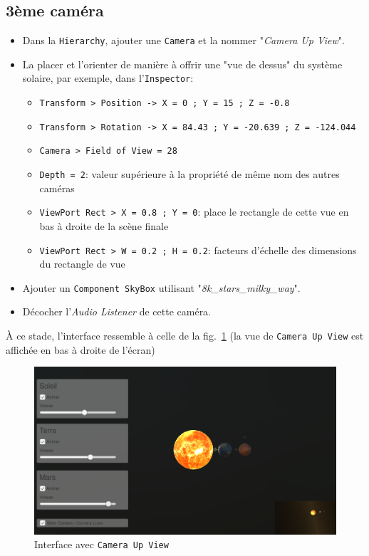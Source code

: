 \documentclass[a4paper,10pt]{article}
\newenvironment{solution}%
{\begin{tcolorbox}[breakable,colback=red!5!white,colframe=red!75!black,title=Solution]}%
{\end{tcolorbox}}
\begin{document}
\begin{solution}
	\subsection{3ème caméra}
\begin{itemize}
	\item Dans la \texttt{Hierarchy}, ajouter une \texttt{Camera} et la nommer "\textit{Camera Up View}".
	\item La placer et l'orienter de manière à offrir une "vue de dessus" du système solaire, par exemple, dans l'\texttt{Inspector}:
	\begin{itemize}
		\item \texttt{Transform > Position -> X = 0 ; Y = 15 ; Z = -0.8}
		\item \texttt{Transform > Rotation -> X = 84.43 ; Y = -20.639 ; Z = -124.044}
		\item \texttt{Camera > Field of View = 28}
		\item \texttt{Depth = 2}: valeur supérieure à la propriété de même nom des autres caméras 
		\item \texttt{ViewPort Rect > X = 0.8 ; Y = 0}: place le rectangle de cette vue en bas à droite de la scène finale
		\item \texttt{ViewPort Rect > W = 0.2 ; H = 0.2}: facteurs d'échelle des dimensions du rectangle de vue
	\end{itemize}
	\item Ajouter un \texttt{Component SkyBox} utilisant "\textit{8k\_stars\_milky\_way}".
	\item Décocher l'\textit{Audio Listener} de cette caméra.
\end{itemize}	
\end{solution}

À ce stade, l'interface ressemble à celle de la fig.~\ref{fig:camera-haut} (la vue de \texttt{Camera Up View} est affichée en bas à droite de l'écran)
\begin{figure}[h]
		\begin{center}
			\includegraphics[scale=.50]{fig/camera-haut}
			\caption{Interface avec \texttt{Camera Up View}}
			\label{fig:camera-haut}
		\end{center}
\end{figure}
\end{document}
